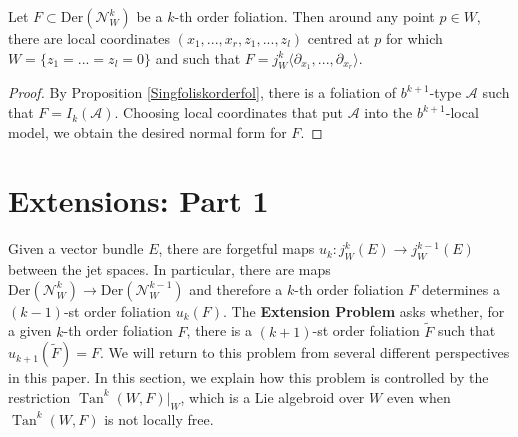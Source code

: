 \documentclass[10pt]{amsart}
\newcommand{\Tan}{{\operatorname{Tan}}}
\numberwithin{theoremalpha}{section}
\numberwithin{equation}{section}
\numberwithin{definition}{section}
\numberwithin{theorem}{section}
\numberwithin{proposition}{section}
\numberwithin{lemma}{section}
\numberwithin{example}{section}
\numberwithin{remark}{section}
\numberwithin{corollary}{section}
\numberwithin{question}{section}
\numberwithin{problem}{section}
\numberwithin{assumption}{section}
\theoremstyle{named}
\numberwithin{equation}{section}
\begin{document}
\begin{corollary} \label{Frobenius} Let $F \subset \mathrm{Der}(\mathcal{N}_{W}^{k})$ be a $k$-th order foliation. Then around any point $p \in W$, there are local coordinates $(x_{1}, ..., x_{r}, z_{1}, ... , z_{l})$ centred at $p$ for which $W = \{ z_{1} = ... = z_{l} = 0 \}$ and such that $F = j_{W}^{k}\langle \partial_{x_{1}}, ..., \partial_{x_{r}} \rangle$. 
\end{corollary}
\begin{proof}
By Proposition \ref{Singfoliskorderfol}, there is a foliation of $b^{k+1}$-type $\mathcal{A}$ such that $F = I_{k}(\mathcal{A})$. Choosing local coordinates that put $\mathcal{A}$ into the $b^{k+1}$-local model, we obtain the desired normal form for $F$. 
\end{proof}



\section{Extensions: Part 1}\label{sec:extending}
Given a vector bundle $E$, there are forgetful maps $u_{k} : j^{k}_{W}(E) \to j^{k-1}_{W}(E)$ between the jet spaces. In particular, there are maps $\mathrm{Der}(\mathcal{N}_{W}^{k}) \to \mathrm{Der}(\mathcal{N}_{W}^{k-1})$ and therefore a $k$-th order foliation $F$ determines a $(k-1)$-st order foliation $u_{k}(F)$. The \textbf{Extension Problem} asks whether, for a given $k$-th order foliation $F$, there is a $(k+1)$-st order foliation $\tilde{F}$ such that $u_{k+1}(\tilde{F}) = F$. We will return to this problem from several different perspectives in this paper. In this section, we explain how this problem is controlled by the restriction $\Tan^{k}(W, F)|_{W}$, which is a Lie algebroid over $W$ even when $\Tan^{k}(W, F)$ is not locally free. 
\end{document}
